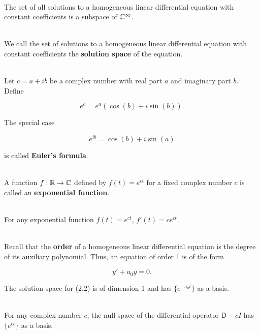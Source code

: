 \begin{corollary}
	\hfill\\
	The set of all solutions to a homogeneous linear differential equation with constant coefficients is a subspace of $\mathbb{C}^\infty$.
\end{corollary}

\begin{definition}
	\hfill\\
	We call the set of solutions to a homogeneous linear differential equation with constant coefficients the \textbf{solution space} of the equation.
\end{definition}

\begin{definition}
	\hfill\\
	Let $c = a+ib$ be a complex number with real part $a$ and imaginary part $b$. Define

	\[e^c = e^a(\cos(b) + i\sin(b)).\]

	The special case

	\[e^{ib} = \cos(b) + i\sin(a)\]

	is called \textbf{Euler's formula}.
\end{definition}

\begin{definition}
	\hfill\\
	A function $f: \mathbb{R} \to \mathbb{C}$ defined by $f(t) = e^{ct}$ for a fixed complex number $c$ is called an \textbf{exponential function}.
\end{definition}

\begin{theorem}
	\hfill\\
	For any exponential function $f(t) = e^{ct}$, $f'(t) = ce^{ct}$.
\end{theorem}

\begin{theorem}
	\hfill\\
	Recall that the \textbf{order} of a homogeneous linear differential equation is the degree of its auxiliary polynomial. Thus, an equation of order 1 is of the form

	\begin{equation}
		y' + a_0y = 0.
	\end{equation}

	The solution space for (2.2) is of dimension 1 and has $\{e^{-a_0t}\}$ as a basis.
\end{theorem}

\begin{corollary}
	\hfill\\
	For any complex number $c$, the null space of the differential operator $\mathsf{D}-cI$ has $\{e^{ct}\}$ as a basis.
\end{corollary}

